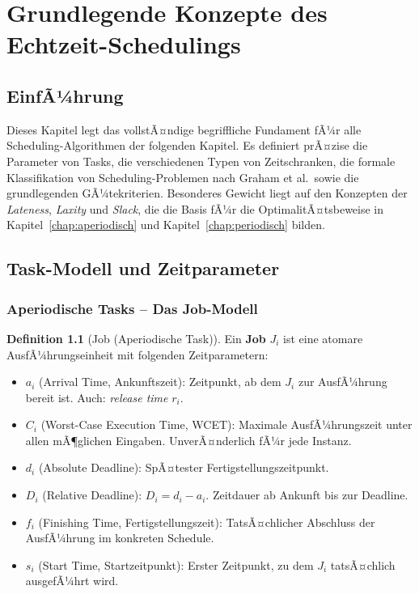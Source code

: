 ﻿\documentclass[a4paper,12pt]{report}
\theoremstyle{definition}
\newtheorem{definition}{Definition}[chapter]
\begin{document}
\chapter{Grundlegende Konzepte des Echtzeit-Schedulings}
\label{chap:basic}

\section{EinfÃ¼hrung}

Dieses Kapitel legt das vollstÃ¤ndige begriffliche Fundament fÃ¼r alle
Scheduling-Algorithmen der folgenden Kapitel. Es definiert prÃ¤zise die
Parameter von Tasks, die verschiedenen Typen von Zeitschranken, die formale
Klassifikation von Scheduling-Problemen nach Graham et al.\ sowie die
grundlegenden GÃ¼tekriterien. Besonderes Gewicht liegt auf den Konzepten
der \emph{Lateness}, \emph{Laxity} und \emph{Slack}, die die Basis fÃ¼r
die OptimalitÃ¤tsbeweise in Kapitel~\ref{chap:aperiodisch} und
Kapitel~\ref{chap:periodisch} bilden.

\section{Task-Modell und Zeitparameter}

\subsection{Aperiodische Tasks -- Das Job-Modell}

\begin{definition}[Job (Aperiodische Task)]
	Ein \textbf{Job} $J_i$ ist eine atomare AusfÃ¼hrungseinheit mit folgenden
	Zeitparametern:
	\begin{itemize}
		\item $a_i$ (Arrival Time, Ankunftszeit): Zeitpunkt, ab dem $J_i$ zur
		      AusfÃ¼hrung bereit ist. Auch: \emph{release time} $r_i$.
		\item $C_i$ (Worst-Case Execution Time, WCET): Maximale AusfÃ¼hrungszeit
		      unter allen mÃ¶glichen Eingaben. UnverÃ¤nderlich fÃ¼r jede Instanz.
		\item $d_i$ (Absolute Deadline): SpÃ¤tester Fertigstellungszeitpunkt.
		\item $D_i$ (Relative Deadline): $D_i = d_i - a_i$. Zeitdauer ab
		      Ankunft bis zur Deadline.
		\item $f_i$ (Finishing Time, Fertigstellungszeit): TatsÃ¤chlicher
		      Abschluss der AusfÃ¼hrung im konkreten Schedule.
		\item $s_i$ (Start Time, Startzeitpunkt): Erster Zeitpunkt, zu dem
		      $J_i$ tatsÃ¤chlich ausgefÃ¼hrt wird.
	\end{itemize}
\end{definition}
\end{document}
